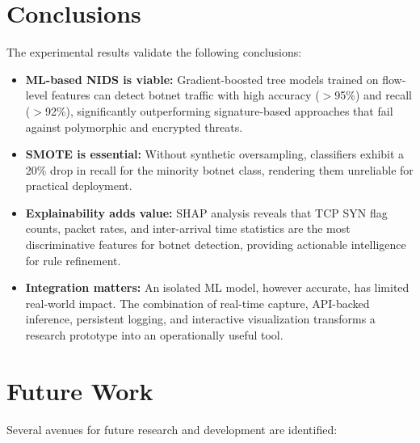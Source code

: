 \section{Conclusions}

The experimental results validate the following conclusions:

\begin{itemize}
    \item \textbf{ML-based NIDS is viable:} Gradient-boosted tree models trained on flow-level features can detect botnet traffic with high accuracy ($>$95\%) and recall ($>$92\%), significantly outperforming signature-based approaches that fail against polymorphic and encrypted threats.

    \item \textbf{SMOTE is essential:} Without synthetic oversampling, classifiers exhibit a 20\% drop in recall for the minority botnet class, rendering them unreliable for practical deployment.

    \item \textbf{Explainability adds value:} SHAP analysis reveals that TCP SYN flag counts, packet rates, and inter-arrival time statistics are the most discriminative features for botnet detection, providing actionable intelligence for rule refinement.

    \item \textbf{Integration matters:} An isolated ML model, however accurate, has limited real-world impact. The combination of real-time capture, API-backed inference, persistent logging, and interactive visualization transforms a research prototype into an operationally useful tool.
\end{itemize}

\section{Future Work}

Several avenues for future research and development are identified:

